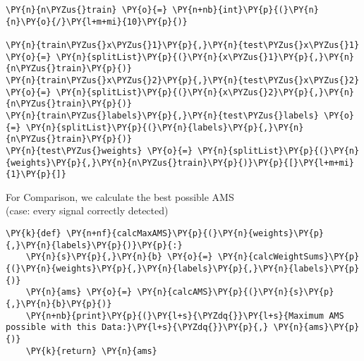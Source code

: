{\par%
\vspace{-1\baselineskip}%
}%
\begin{notebookcell}[]%
\begin{addmargin}[\cellleftmargin]{0em}%
{\smaller%
\par%
%
\vspace{-1\smallerfontscale}%
\begin{Verbatim}[commandchars=\\\{\}]
\PY{n}{n\PYZus{}train} \PY{o}{=} \PY{n+nb}{int}\PY{p}{(}\PY{n}{n}\PY{o}{/}\PY{l+m+mi}{10}\PY{p}{)}

\PY{n}{train\PYZus{}x\PYZus{}1}\PY{p}{,}\PY{n}{test\PYZus{}x\PYZus{}1} \PY{o}{=} \PY{n}{splitList}\PY{p}{(}\PY{n}{x\PYZus{}1}\PY{p}{,}\PY{n}{n\PYZus{}train}\PY{p}{)}
\PY{n}{train\PYZus{}x\PYZus{}2}\PY{p}{,}\PY{n}{test\PYZus{}x\PYZus{}2} \PY{o}{=} \PY{n}{splitList}\PY{p}{(}\PY{n}{x\PYZus{}2}\PY{p}{,}\PY{n}{n\PYZus{}train}\PY{p}{)}
\PY{n}{train\PYZus{}labels}\PY{p}{,}\PY{n}{test\PYZus{}labels} \PY{o}{=} \PY{n}{splitList}\PY{p}{(}\PY{n}{labels}\PY{p}{,}\PY{n}{n\PYZus{}train}\PY{p}{)}
\PY{n}{test\PYZus{}weights} \PY{o}{=} \PY{n}{splitList}\PY{p}{(}\PY{n}{weights}\PY{p}{,}\PY{n}{n\PYZus{}train}\PY{p}{)}\PY{p}{[}\PY{l+m+mi}{1}\PY{p}{]}
\end{Verbatim}
%
\par%
\vspace{-1\smallerfontscale}}%
\end{addmargin}
\end{notebookcell}


    For Comparison, we calculate the best possible AMS\\
(case: every signal correctly detected)


{\par%
\vspace{-1\baselineskip}%
}%
\begin{notebookcell}[]%
\begin{addmargin}[\cellleftmargin]{0em}%
{\smaller%
\par%
%
\vspace{-1\smallerfontscale}%
\begin{Verbatim}[commandchars=\\\{\}]
\PY{k}{def} \PY{n+nf}{calcMaxAMS}\PY{p}{(}\PY{n}{weights}\PY{p}{,}\PY{n}{labels}\PY{p}{)}\PY{p}{:}
    \PY{n}{s}\PY{p}{,}\PY{n}{b} \PY{o}{=} \PY{n}{calcWeightSums}\PY{p}{(}\PY{n}{weights}\PY{p}{,}\PY{n}{labels}\PY{p}{,}\PY{n}{labels}\PY{p}{)}
    \PY{n}{ams} \PY{o}{=} \PY{n}{calcAMS}\PY{p}{(}\PY{n}{s}\PY{p}{,}\PY{n}{b}\PY{p}{)}
    \PY{n+nb}{print}\PY{p}{(}\PY{l+s}{\PYZdq{}}\PY{l+s}{Maximum AMS possible with this Data:}\PY{l+s}{\PYZdq{}}\PY{p}{,} \PY{n}{ams}\PY{p}{)}
    \PY{k}{return} \PY{n}{ams}
\end{Verbatim}
%
\par%
\vspace{-1\smallerfontscale}}%
\end{addmargin}
\end{notebookcell}


